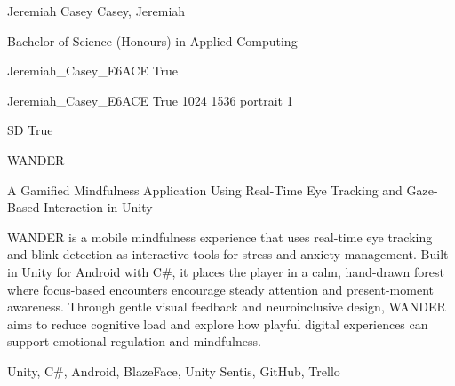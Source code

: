 \documentclass[twoside]{report}
\begin{document}
\begingroup{}\relax



\def\Key{Jeremiah_Casey_E6ACE}

{Jeremiah Casey}
{Casey, Jeremiah}

{Bachelor of Science (Honours) in Applied Computing}

{Jeremiah_Casey_E6ACE}
{True}

{Jeremiah_Casey_E6ACE}
{True}
{1024}
{1536}
{portrait}
{1}

{SD}
{True}

{WANDER}

{A Gamified Mindfulness Application Using Real-Time Eye Tracking and Gaze-Based Interaction in Unity}

{WANDER is a mobile mindfulness experience that uses real-time eye tracking and blink detection as interactive tools for stress and anxiety management. Built in Unity for Android with C\#, it places the player in a calm, hand-drawn forest where focus-based encounters encourage steady attention and present-moment awareness. Through gentle visual feedback and neuroinclusive design, WANDER aims to reduce cognitive load and explore how playful digital experiences can support emotional regulation and mindfulness.}

{Unity, C\#, Android, BlazeFace, Unity Sentis, GitHub, Trello}
\end{document}
